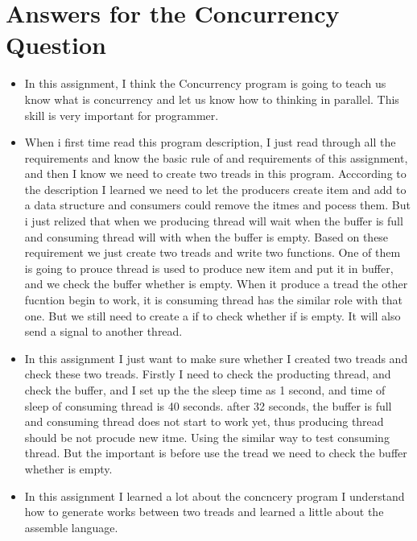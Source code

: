 \documentclass[letterpaper,10pt]{article}
\begin{document}
\section{Answers for the Concurrency Question}
  \begin{itemize}
  \item In this assignment, I think the Concurrency program is going to teach us know what is concurrency and let us know how to thinking in parallel. This skill is very important for programmer.\\ 
  \item When i first time read this program description, I just read through all the requirements and know the basic rule of and requirements of this assignment, and then I know we need to create two treads in this program.  Acccording to the description I learned we need to let the producers create item and add to a data structure and consumers could remove the itmes and pocess them. But i just relized that when we producing thread will wait when the buffer is full and consuming thread will with when the buffer is empty. Based on these requirement we just create two treads and write two functions. One of them  is going to  prouce thread is used to produce new item and put it in buffer, and we check the buffer whether is empty. When it produce a tread the other fucntion begin to work, it is consuming thread has the similar role with that one. But we still need to create a if to check whether if is empty. It will also send a signal to another thread.\\
  \item In this assignment I just want to make sure whether I created two treads and check these two treads. Firstly I need to check the producting thread, and check the buffer, and I set up the the sleep time as 1 second,  and time of sleep of consuming thread is 40 seconds. after 32 seconds, the buffer is full and consuming thread does not start to work yet, thus producing thread should be not procude new itme. Using the similar way to test consuming thread. But the important is before use the tread we need to check the buffer whether is empty.\\
  \item In this assignment I learned a lot about the concncery program I understand how to generate works between two treads and learned a little about the assemble language.\\
  \end{itemize}
\end{document}
